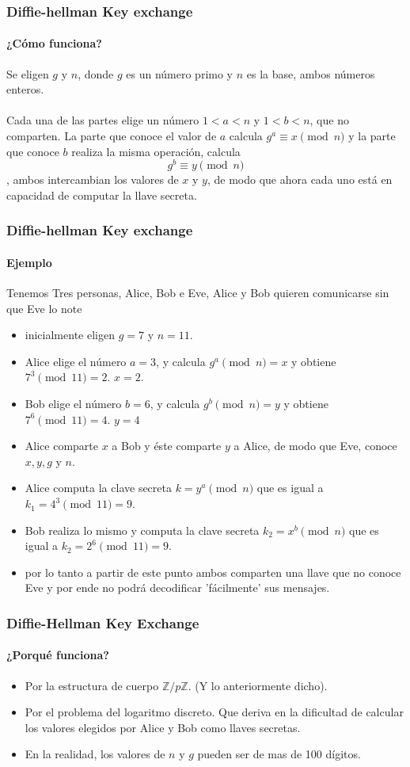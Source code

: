 \documentclass[spanish, mexico]{beamer}
\begin{document}
	\begin{frame}
		\frametitle{Diffie-hellman Key exchange}
		\framesubtitle{¿Cómo funciona?}
		Se eligen $g$ y $n$, donde $g$ es un número primo y $n$ es la base, ambos números enteros.\\~\\
		Cada una de las partes elige un número $1<a<n$ y $1<b<n$, que no comparten. La parte que conoce el valor de $a$ calcula $g^{a} \equiv x \pmod{n}$ y la parte que conoce $b$ realiza la misma operación, calcula $$g^{b} \equiv y \pmod{n}$$, ambos intercambian los valores de $x$ y $y$, de modo que ahora cada uno está en capacidad de computar la llave secreta. 
	\end{frame}
	\begin{frame}
	    \frametitle{Diffie-hellman Key exchange}
		\framesubtitle{Ejemplo}
		Tenemos Tres personas, Alice, Bob e Eve, Alice y Bob quieren comunicarse sin que Eve lo note
		\begin{itemize}
		    \item inicialmente eligen $g=7$ y $n=11$.
		    \item Alice elige el número $a=3$, y calcula $g^{a} \pmod{n} = x$ y obtiene $7^{3} \pmod{11} = 2$. $x=2$.
		    \item Bob elige el número $b=6$, y calcula $g^{b} \pmod{n} = y$ y obtiene $7^{6} \pmod{11} = 4$. $y=4$
		    \item Alice comparte $x$ a Bob y éste comparte $y$ a Alice, de modo que Eve, conoce $x,y,g$ y $n$.
		    \item Alice computa la clave secreta $k = y^{a} \pmod{n}$ que es igual a $k_1 = 4^{3} \pmod{11} = 9$.
		    \item Bob realiza lo mismo y computa la clave secreta $k_2 = x^{b} \pmod{n}$ que es igual a $k_2 = 2^{6} \pmod{11} = 9$.
		    \item por lo tanto a partir de este punto ambos comparten una llave que no conoce Eve y por ende no podrá decodificar 'fácilmente' sus mensajes.
		\end{itemize}   
	\end{frame}

	\begin{frame}
		\frametitle{Diffie-Hellman Key Exchange}
		\framesubtitle{¿Porqué funciona?}
		\begin{itemize}
		    \item Por la estructura de cuerpo $\mathbb{Z}/p\mathbb{Z}$. (Y lo anteriormente dicho).
		    \item Por el problema del logaritmo discreto. Que deriva en la dificultad de calcular los valores elegidos por Alice y Bob como llaves secretas.
		    \item En la realidad, los valores de $n$ y $g$ pueden ser de mas de 100 dígitos.
		\end{itemize}
	\end{frame}
\end{document}
